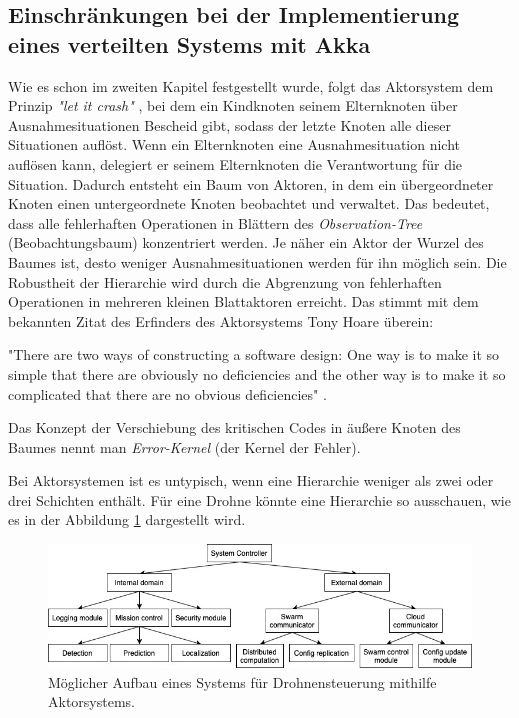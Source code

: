 \subsection{Einschränkungen bei der Implementierung eines verteilten Systems mit Akka}

Wie es schon im zweiten Kapitel festgestellt wurde, folgt das Aktorsystem dem Prinzip \textit{"let it crash"} \cite{Armstrong93concurrentprogramming}, bei dem ein Kindknoten seinem Elternknoten über Ausnahmesituationen Bescheid gibt, sodass der letzte Knoten alle dieser Situationen auflöst. Wenn ein Elternknoten eine Ausnahmesituation nicht auflösen kann, delegiert er seinem Elternknoten die Verantwortung für die Situation. Dadurch entsteht ein Baum von Aktoren, in dem ein übergeordneter Knoten einen untergeordnete Knoten beobachtet und verwaltet. Das bedeutet, dass alle fehlerhaften Operationen in Blättern des \textit{Observation-Tree} (Beobachtungsbaum) konzentriert werden. Je näher ein Aktor der Wurzel des Baumes ist, desto weniger Ausnahmesituationen werden für ihn möglich sein. Die Robustheit der Hierarchie wird durch die Abgrenzung von fehlerhaften Operationen in mehreren kleinen Blattaktoren erreicht. Das stimmt mit dem bekannten Zitat des Erfinders des Aktorsystems Tony Hoare überein:

"There are two ways of constructing a software design: One way is to make it so simple that there are obviously no deficiencies and the other way is to make it so complicated that there are no obvious deficiencies" \cite{Graham_communicatingsequential}.

Das Konzept der Verschiebung des kritischen Codes in äußere Knoten des Baumes nennt man \textit{Error-Kernel} (der Kernel der Fehler).

Bei Aktorsystemen ist es untypisch, wenn eine Hierarchie weniger als zwei oder drei Schichten enthält. Für eine Drohne könnte eine Hierarchie so ausschauen, wie es in der Abbildung \ref{fig:hierarchy1} dargestellt wird.

\begin{figure}
	\centering
	\includegraphics[width=0.7\linewidth]{images/5_hierarchy_1}
	\caption{Möglicher Aufbau eines Systems für Drohnensteuerung mithilfe Aktorsystems.}
	\label{fig:hierarchy1}
\end{figure}

